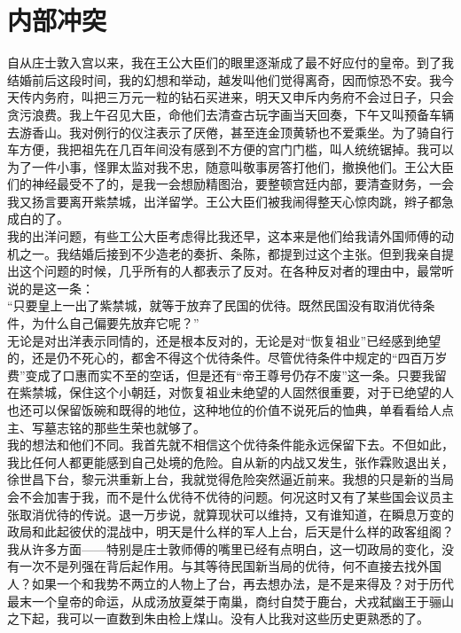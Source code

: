 \fancyhead[RO]{} %
\fancyhead[LE]{} %
\chapter*{内部冲突}
\thispagestyle{empty}
自从庄士敦入宫以来，我在王公大臣们的眼里逐渐成了最不好应付的皇帝。到了我结婚前后这段时间，我的幻想和举动，越发叫他们觉得离奇，因而惊恐不安。我今天传内务府，叫把三万元一粒的钻石买进来，明天又申斥内务府不会过日子，只会贪污浪费。我上午召见大臣，命他们去清查古玩字画当天回奏，下午又叫预备车辆去游香山。我对例行的仪注表示了厌倦，甚至连金顶黄轿也不爱乘坐。为了骑自行车方便，我把祖先在几百年间没有感到不方便的宫门门槛，叫人统统锯掉。我可以为了一件小事，怪罪太监对我不忠，随意叫敬事房答打他们，撤换他们。王公大臣们的神经最受不了的，是我一会想励精图治，要整顿宫廷内部，要清查财务，一会我又扬言要离开紫禁城，出洋留学。王公大臣们被我闹得整天心惊肉跳，辫子都急成白的了。\\

我的出洋问题，有些工公大臣考虑得比我还早，这本来是他们给我请外国师傅的动机之一。我结婚后接到不少造老的奏折、条陈，都提到过这个主张。但到我亲自提出这个问题的时候，几乎所有的人都表示了反对。在各种反对者的理由中，最常听说的是这一条：\\

“只要皇上一出了紫禁城，就等于放弃了民国的优待。既然民国没有取消优待条件，为什么自己偏要先放弃它呢？”\\

无论是对出洋表示同情的，还是根本反对的，无论是对“恢复祖业”已经感到绝望的，还是仍不死心的，都舍不得这个优待条件。尽管优待条件中规定的“四百万岁费”变成了口惠而实不至的空话，但是还有“帝王尊号仍存不废”这一条。只要我留在紫禁城，保住这个小朝廷，对恢复祖业未绝望的人固然很重要，对于已绝望的人也还可以保留饭碗和既得的地位，这种地位的价值不说死后的恤典，单看看给人点主、写墓志铭的那些生荣也就够了。\\

我的想法和他们不同。我首先就不相信这个优待条件能永远保留下去。不但如此，我比任何人都更能感到自己处境的危险。自从新的内战又发生，张作霖败退出关，徐世昌下台，黎元洪重新上台，我就觉得危险突然逼近前来。我想的只是新的当局会不会加害于我，而不是什么优待不优待的问题。何况这时又有了某些国会议员主张取消优待的传说。退一万步说，就算现状可以维持，又有谁知道，在瞬息万变的政局和此起彼伏的混战中，明天是什么样的军人上台，后天是什么样的政客组阁？我从许多方面——特别是庄士敦师傅的嘴里已经有点明白，这一切政局的变化，没有一次不是列强在背后起作用。与其等待民国新当局的优待，何不直接去找外国人？如果一个和我势不两立的人物上了台，再去想办法，是不是来得及？对于历代最末一个皇帝的命运，从成汤放夏桀于南巢，商纣自焚于鹿台，犬戎弑幽王于骊山之下起，我可以一直数到朱由检上煤山。没有人比我对这些历史更熟悉的了。\\

